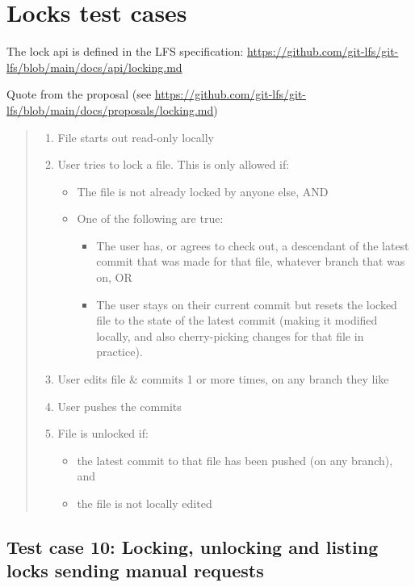 \newpage
\section{Locks test cases}

The lock api is defined in the LFS specification: \url{https://github.com/git-lfs/git-lfs/blob/main/docs/api/locking.md}

Quote from the proposal (see \url{https://github.com/git-lfs/git-lfs/blob/main/docs/proposals/locking.md})

\begin{quote}
    \begin{enumerate}
        \item File starts out read-only locally
        \item User tries to lock a file. This is only allowed if:
        \begin{itemize}
            \item The file is not already locked by anyone else, AND
            \item One of the following are true:
            \begin{itemize}
                \item The user has, or agrees to check out, a descendant of the latest commit that was made for that file, whatever branch that was on, OR
                \item The user stays on their current commit but resets the locked file to the state of the latest commit (making it modified locally, and also cherry-picking changes for that file in practice).
            \end{itemize}
        \end{itemize}
        \item User edits file \& commits 1 or more times, on any branch they like
        \item User pushes the commits
        \item File is unlocked if:
        \begin{itemize}
            \item the latest commit to that file has been pushed (on any branch), and
            \item the file is not locally edited
        \end{itemize}
    \end{enumerate}
    
\end{quote}

\subsection{Test case 10: Locking, unlocking and listing locks sending manual requests}


